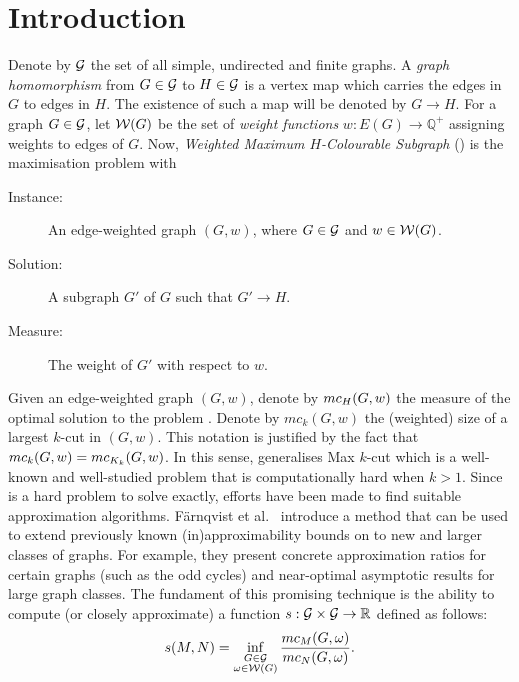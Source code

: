 \documentclass[11pt,a4paper]{article}
\begin{document}
\section{Introduction}
Denote by ${\cal G}$ the set of all simple, undirected and
finite graphs. 
A \emph{graph homomorphism} from $G \in {\cal G}$ to $H \in {\cal G}$ is a vertex map which
carries the edges in $G$ to edges in $H$.
The existence of such a map will be denoted by $G \rightarrow H$.
For a graph $G \in {\cal G}$, let
${\cal W}(G)$ be the set of \emph{weight functions}
$w : E(G) \rightarrow {\mathbb Q}^+$ assigning weights
to edges of $G$.
Now,
  {\em Weighted Maximum $H$-Colourable Subgraph} () is the
maximisation problem with
  \begin{description}
  \item[Instance:] An edge-weighted graph $(G,w)$, where $G \in {\cal
G}$ and
    $w \in {\cal W}(G)$.
  \item[Solution:] A subgraph $G'$ of $G$ such that $G' \rightarrow H$.
  \item[Measure:] The weight of $G'$ with respect to $w$.
  \end{description}

\noindent
Given an edge-weighted graph $(G,w)$, denote by $mc_H(G,w)$ the measure
of the optimal solution to the problem .
Denote by $mc_k(G,w)$ the
(weighted) size of a largest $k$-cut in $(G,w)$.
This notation is justified by the fact that
$mc_k(G,w) = mc_{K_k}(G,w)$.
In this sense,  generalises {\sc Max $k$-cut} which is a
well-known and well-studied problem that is computationally hard
when $k > 1$.
Since  is a hard problem to solve exactly, efforts have been
made to find suitable approximation algorithms.
F\"arnqvist et al.~\cite{farnqvist:etal:09} introduce a
method that can be used to extend previously known
(in)approximability bounds on  to new and larger classes of
graphs. For example, they 
present concrete approximation ratios for certain graphs (such as the odd cycles) 
and
near-optimal asymptotic results for large graph classes.
The fundament of this promising technique is the ability to compute 
(or closely approximate) a function
$s: {\cal G} \times {\cal G} \rightarrow {\mathbb R}$ defined as follows: 
\begin{equation}
\label{eq:s}
s(M,N) = \inf_{\substack{G \in {\cal G} \\ \omega \in {\cal
W}(G)}}{\frac{mc_M(G,\omega)}{mc_N(G,\omega)}}.
\end{equation}
\end{document}
